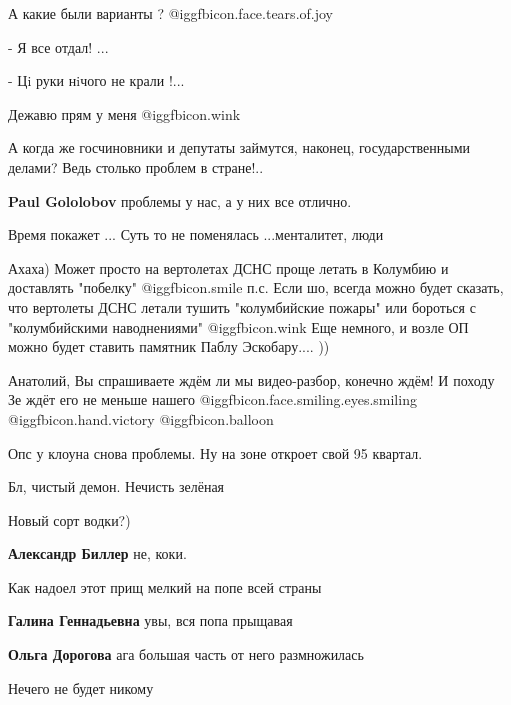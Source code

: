 \begin{itemize}
А какие были варианты ?  @igg{fbicon.face.tears.of.joy} 


- Я все отдал! ...

- Цi руки нiчого не крали !...

Дежавю прям у меня  @igg{fbicon.wink} 


А когда же госчиновники и депутаты займутся, наконец, государственными делами?
Ведь столько проблем в стране!..

\textbf{Paul Gololobov} проблемы у нас, а у них все отлично.

Время покажет ...
Суть то не поменялась ...менталитет, люди


Ахаха) Может просто на вертолетах ДСНС проще летать в Колумбию и доставлять
"побелку"  @igg{fbicon.smile}  п.с. Если шо, всегда можно будет сказать, что вертолеты ДСНС
летали тушить "колумбийские пожары" или бороться с "колумбийскими наводнениями"
 @igg{fbicon.wink}  Еще немного, и возле ОП можно будет ставить памятник Паблу Эскобару.... ))


Анатолий, Вы спрашиваете ждём ли мы видео-разбор, конечно ждём! И походу Зе ждёт его не меньше нашего @igg{fbicon.face.smiling.eyes.smiling} @igg{fbicon.hand.victory} @igg{fbicon.balloon} 

Опс у клоуна снова проблемы. Ну на зоне откроет свой 95 квартал.

Бл, чистый демон. Нечисть зелёная

Новый сорт водки?)

\textbf{Александр Биллер} не, коки.

Как надоел этот прищ мелкий на попе всей страны

\begin{itemize} %
\textbf{Галина Геннадьевна} увы, вся попа прыщавая

\textbf{Ольга Дорогова} ага большая часть от него размножилась
\end{itemize} %

Нечего не будет никому



\end{itemize}
